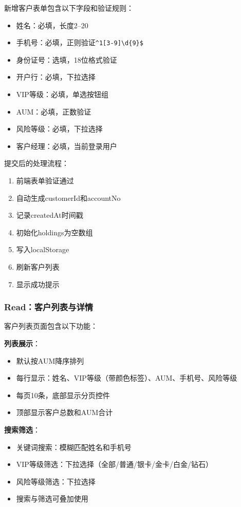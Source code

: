 新增客户表单包含以下字段和验证规则：

\begin{itemize}[leftmargin=2em]
  \item 姓名：必填，长度2--20
  \item 手机号：必填，正则验证\texttt{\^{}1[3-9]\textbackslash d\{9\}\$}
  \item 身份证号：选填，18位格式验证
  \item 开户行：必填，下拉选择
  \item VIP等级：必填，单选按钮组
  \item AUM：必填，正数验证
  \item 风险等级：必填，下拉选择
  \item 客户经理：必填，当前登录用户
\end{itemize}

提交后的处理流程：
\begin{enumerate}[leftmargin=2em]
  \item 前端表单验证通过
  \item 自动生成customerId和accountNo
  \item 记录createdAt时间戳
  \item 初始化holdings为空数组
  \item 写入localStorage
  \item 刷新客户列表
  \item 显示成功提示
\end{enumerate}

\subsubsection{Read：客户列表与详情}

客户列表页面包含以下功能：

\textbf{列表展示}：
\begin{itemize}[leftmargin=2em]
  \item 默认按AUM降序排列
  \item 每行显示：姓名、VIP等级（带颜色标签）、AUM、手机号、风险等级
  \item 每页10条，底部显示分页控件
  \item 顶部显示客户总数和AUM合计
\end{itemize}

\textbf{搜索筛选}：
\begin{itemize}[leftmargin=2em]
  \item 关键词搜索：模糊匹配姓名和手机号
  \item VIP等级筛选：下拉选择（全部/普通/银卡/金卡/白金/钻石）
  \item 风险等级筛选：下拉选择
  \item 搜索与筛选可叠加使用
\end{itemize}

